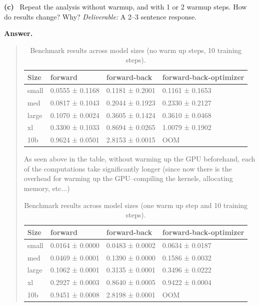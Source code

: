 \documentclass[11pt]{article}
\newcommand{\subq}[1]{\vspace{0.3em}\noindent\textbf{(#1)}\ }
\newcommand{\deliverable}[1]{\vspace{0.2em}\noindent\textit{Deliverable:} #1\par}
\newenvironment{answer}{%
  \vspace{0.3em}%
  \noindent\textbf{Answer.}\begin{quote}%
}{%
  \end{quote}\vspace{0.4em}%
}
\begin{document}
\subq{c} Repeat the analysis without warmup, and with 1 or 2 warmup steps. How do results change? Why?
\deliverable{A 2--3 sentence response.}
\begin{answer}
  \begin{table}[H]
    \centering
    \caption{Benchmark results across model sizes (no warm up steps, 10 training steps).}
    \label{tab:model-benchmark-results-no-warmup}
    \begin{tabular}{llll}
    \toprule
    Size & forward & forward-back & forward-back-optimizer \\
    \midrule
    small & 0.0555 ± 0.1168 & 0.1181 ± 0.2001 & 0.1161 ± 0.1653 \\
    med & 0.0817 ± 0.1043 & 0.2044 ± 0.1923 & 0.2330 ± 0.2127 \\
    large & 0.1070 ± 0.0024 & 0.3605 ± 0.1424 & 0.3610 ± 0.0468 \\
    xl & 0.3300 ± 0.1033 & 0.8694 ± 0.0265 & 1.0079 ± 0.1902 \\
    10b & 0.9624 ± 0.0501 & 2.8153 ± 0.0015 & OOM \\
    \bottomrule
    \end{tabular}
    \end{table}    

    As seen above in the table, without warming up the GPU beforehand, each of the computations take significantly longer (since now there is the overhead for warming up the GPU--compiling the kernels, allocating memory, etc...)

  \begin{table}[H]
    \centering
    \caption{Benchmark results across model sizes (one warm up step and 10 training steps).}
    \label{tab:model-benchmark-results-one-warmup-step}
    \begin{tabular}{llll}
    \toprule
    Size & forward & forward-back & forward-back-optimizer \\
    \midrule
    small & 0.0164 ± 0.0000 & 0.0483 ± 0.0002 & 0.0634 ± 0.0187 \\
    med & 0.0469 ± 0.0001 & 0.1390 ± 0.0000 & 0.1586 ± 0.0032 \\
    large & 0.1062 ± 0.0001 & 0.3135 ± 0.0001 & 0.3496 ± 0.0222 \\
    xl & 0.2927 ± 0.0003 & 0.8640 ± 0.0005 & 0.9422 ± 0.0004 \\
    10b & 0.9451 ± 0.0008 & 2.8198 ± 0.0001 & OOM \\
    \bottomrule
    \end{tabular}
    \end{table}
      


\end{answer}
\end{document}
